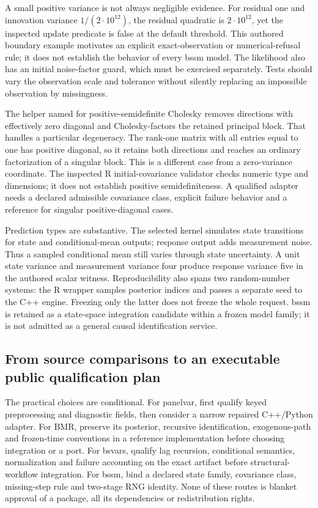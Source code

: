 A small positive variance is not always negligible evidence. For residual one and innovation variance $1/(2\cdot10^{12})$, the residual quadratic is $2\cdot10^{12}$, yet the inspected update predicate is false at the default threshold. This authored boundary example motivates an explicit exact-observation or numerical-refusal rule; it does not establish the behavior of every bssm model. The likelihood also has an initial noise-factor guard, which must be exercised separately. Tests should vary the observation scale and tolerance without silently replacing an impossible observation by missingness.\citep{exec25_cdyn_bssm,exec25_cdyn_choice}

The helper named for positive-semidefinite Cholesky removes directions with effectively zero diagonal and Cholesky-factors the retained principal block. That handles a particular degeneracy. The rank-one matrix with all entries equal to one has positive diagonal, so it retains both directions and reaches an ordinary factorization of a singular block. This is a different case from a zero-variance coordinate. The inspected R initial-covariance validator checks numeric type and dimensions; it does not establish positive semidefiniteness. A qualified adapter needs a declared admissible covariance class, explicit failure behavior and a reference for singular positive-diagonal cases.\citep{exec25_cdyn_bssm,exec25_cdyn_choice}

Prediction types are substantive. The selected kernel simulates state transitions for state and conditional-mean outputs; response output adds measurement noise. Thus a sampled conditional mean still varies through state uncertainty. A unit state variance and measurement variance four produce response variance five in the authored scalar witness. Reproducibility also spans two random-number systems: the R wrapper samples posterior indices and passes a separate seed to the C++ engine. Freezing only the latter does not freeze the whole request. bssm is retained as a state-space integration candidate within a frozen model family; it is not admitted as a general causal identification service.\citep{exec25_cdyn_bssm,exec25_cdyn_choice}

\subsection{From source comparisons to an executable public qualification plan}

The practical choices are conditional. For panelvar, first qualify keyed preprocessing and diagnostic fields, then consider a narrow repaired C++/Python adapter. For BMR, preserve its posterior, recursive identification, exogenous-path and frozen-time conventions in a reference implementation before choosing integration or a port. For bsvars, qualify lag recursion, conditional semantics, normalization and failure accounting on the exact artifact before structural-workflow integration. For bssm, bind a declared state family, covariance class, missing-step rule and two-stage RNG identity. None of these routes is blanket approval of a package, all its dependencies or redistribution rights.\citep{exec25_cdyn_choice}

